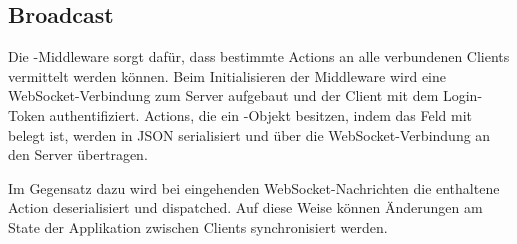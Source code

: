 \subsection{Broadcast}
\label{ssec:fm_broadcast}

Die -Middleware sorgt dafür, dass bestimmte Actions an alle
verbundenen Clients vermittelt werden können.  Beim Initialisieren der
Middleware wird eine WebSocket-Verbindung zum Server aufgebaut und der Client mit
dem Login-Token authentifiziert.  Actions, die ein -Objekt besitzen,
indem das Feld  mit  belegt ist, werden in JSON
serialisiert und über die WebSocket-Verbindung an den Server übertragen.

Im Gegensatz dazu wird bei eingehenden WebSocket-Nachrichten die enthaltene
Action deserialisiert und dispatched.  Auf diese Weise können Änderungen am
State der Applikation zwischen Clients synchronisiert werden.
